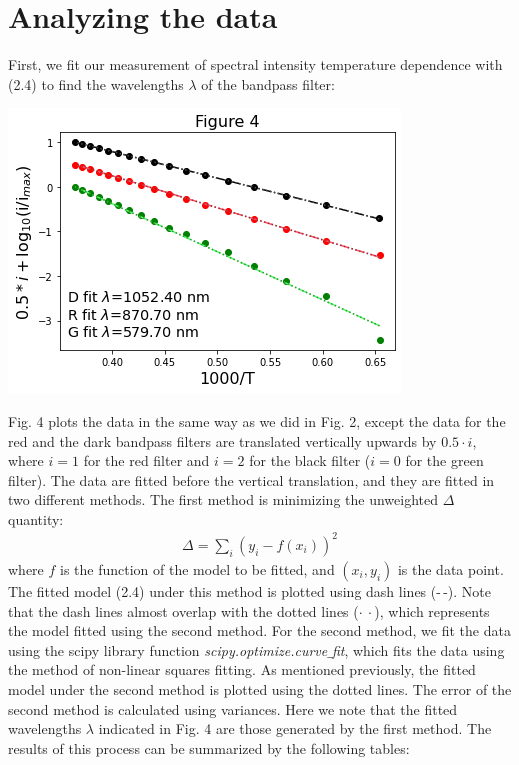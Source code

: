 \documentclass[11pt]{book}
\theoremstyle{break}
\theoremstyle{break}
\begin{document}
\section{Analyzing the data}
First, we fit our measurement of spectral intensity temperature dependence with (2.4) to find the wavelengths $\lambda$ of the bandpass filter:
\begin{center}
\includegraphics[scale=0.65]{fitLam.png}
\end{center}
Fig. 4 plots the data in the same way as we did in Fig. 2, except the data for the red and the dark bandpass filters are translated vertically upwards by $0.5\cdot i$, where $i=1$ for the red filter and $i=2$ for the black filter ($i=0$ for the green filter). The data are fitted before the vertical translation, and they are fitted in two different methods. The first method is minimizing the unweighted $\Delta$ quantity:
\begin{align*}
\Delta = \sum_i \left(y_i - f(x_i)\right)^2
\end{align*} 
where $f$ is the function of the model to be fitted, and $(x_i,y_i)$ is the data point. The fitted model (2.4) under this method is plotted using dash lines (-\,-). Note that the dash lines almost overlap with the dotted lines ($\cdot\ \cdot$), which represents the model fitted using the second method. For the second method, we fit the data using the scipy library function \textit{scipy.optimize.curve$\_$fit}, which fits the data using the method of non-linear squares fitting. As mentioned previously, the fitted model under the second method is plotted using the dotted lines. The error of the second method is calculated using variances. Here we note that the fitted wavelengths $\lambda$ indicated in Fig. 4 are those generated by the first method. The results of this process can be summarized by the following tables:
\end{document}
